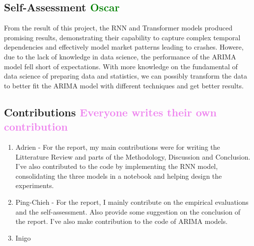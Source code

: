 \documentclass[12pt, letterpaper]{article}
\begin{document}
\subsection*{Self-Assessment \textcolor{green}{Oscar}}
From the result of this project, the RNN and Transformer models produced promising results, demonstrating their capability to capture complex temporal dependencies and effectively model market patterns leading to crashes. Howere, due to the lack of knowledge in data science, the performance of the ARIMA model fell short of expectations. With more knowledge on the fundamental of data science of preparing data and statistics, we can possibly transform the data to better fit the ARIMA model with different techniques and get better results.

\pagebreak
\subsection*{Contributions \textcolor{violet}{Everyone writes their own contribution}}
\begin{enumerate}
    \item Adrien - 
        For the report, my main contributions were for writing the Litterature Review and parts of the Methodology, Discussion and Conclusion. I've also contributed to the code by implementing the RNN model, consolidating the three models in a notebook and helping design the experiments.
    \item Ping-Chieh - 
        For the report, I mainly contribute on the empirical evaluations and the self-assessment. Also provide some suggestion on the conclusion of the report. I've also make contribution to the code of ARIMA models.
    \item Inigo
\end{enumerate}
\end{document}
